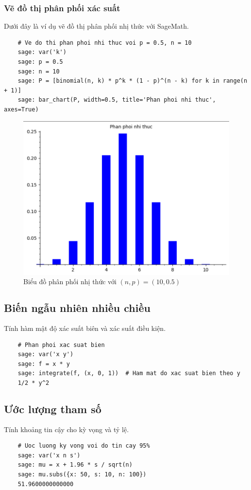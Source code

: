 \subsubsection{Vẽ đồ thị phân phối xác suất}
Dưới đây là ví dụ vẽ đồ thị phân phối nhị thức với SageMath.

\begin{lstlisting}
	# Ve do thi phan phoi nhi thuc voi p = 0.5, n = 10
	sage: var('k')
	sage: p = 0.5
	sage: n = 10
	sage: P = [binomial(n, k) * p^k * (1 - p)^(n - k) for k in range(n + 1)]
	sage: bar_chart(P, width=0.5, title='Phan phoi nhi thuc', axes=True)
\end{lstlisting}
\begin{figure}[H]
	\centering
	\includegraphics[width=0.7\linewidth]{images/screenshot001}
	\caption{Biểu đồ phân phối nhị thức với $(n,p)=(10,0.5)$}
	\label{fig:screenshot001}
\end{figure}

\subsection{Biến ngẫu nhiên nhiều chiều}
Tính hàm mật độ xác suất biên và xác suất điều kiện.

\begin{lstlisting}
	# Phan phoi xac suat bien
	sage: var('x y')
	sage: f = x * y
	sage: integrate(f, (x, 0, 1))  # Ham mat do xac suat bien theo y
	1/2 * y^2
\end{lstlisting}

\subsection{Ước lượng tham số}
Tính khoảng tin cậy cho kỳ vọng và tỷ lệ.

\begin{lstlisting}
	# Uoc luong ky vong voi do tin cay 95%
	sage: var('x n s')
	sage: mu = x + 1.96 * s / sqrt(n)
	sage: mu.subs({x: 50, s: 10, n: 100})
	51.9600000000000
\end{lstlisting}

